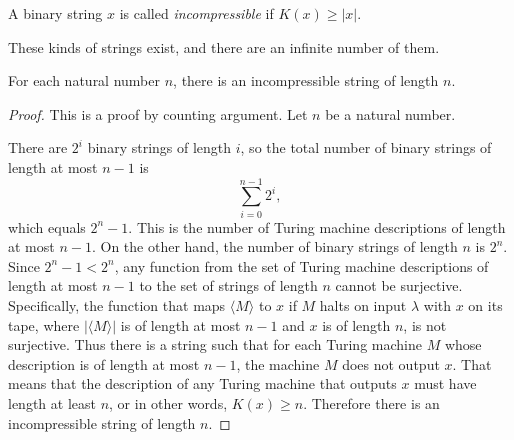 \begin{definition}
  A binary string $x$ is called \emph{incompressible} if $K(x) \geq |x|$.
\end{definition}

These kinds of strings exist, and there are an infinite number of them.

\begin{theorem}
  For each natural number $n$, there is an incompressible string of length $n$.
\end{theorem}
\begin{proof}
  This is a proof by counting argument.
  Let $n$ be a natural number.


  There are $2^i$ binary strings of length $i$, so the total number of binary strings of length at most $n - 1$ is
  $$
  \sum_{i = 0}^{n - 1} 2^i,
  $$
  which equals $2^n - 1$.
  This is the number of Turing machine descriptions of length at most $n - 1$.
  On the other hand, the number of binary strings of length $n$ is $2^n$.
  Since $2^n - 1 < 2^n$, any function from the set of Turing machine descriptions of length at most $n - 1$ to the set of strings of length $n$ cannot be surjective.
  Specifically, the function that maps $\langle M \rangle$ to $x$ if $M$ halts on input $\lambda$ with $x$ on its tape, where $|\langle M \rangle|$ is of length at most $n - 1$ and $x$ is of length $n$, is not surjective.
  Thus there is a string such that for each Turing machine $M$ whose description is of length at most $n - 1$, the machine $M$ does not output $x$.
  That means that the description of any Turing machine that outputs $x$ must have length at least $n$, or in other words, $K(x) \geq n$.
  Therefore there is an incompressible string of length $n$.



\end{proof}

